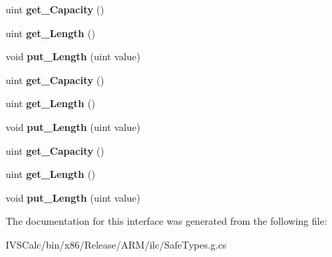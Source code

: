 \begin{DoxyCompactItemize}
uint {\bfseries get\+\_\+\+Capacity} ()
\item 
\mbox{\label{interface_windows_1_1_storage_1_1_streams_1_1_i_buffer_ab2bdd0bfe5d289ab0906235c00253ea8}} 
uint {\bfseries get\+\_\+\+Length} ()
\item 
\mbox{\label{interface_windows_1_1_storage_1_1_streams_1_1_i_buffer_af3c81c6537be15b7d1491efd58f4187f}} 
void {\bfseries put\+\_\+\+Length} (uint value)
\item 
\mbox{\label{interface_windows_1_1_storage_1_1_streams_1_1_i_buffer_a73aee2ef2c52acc14891ef47d26177d4}} 
uint {\bfseries get\+\_\+\+Capacity} ()
\item 
\mbox{\label{interface_windows_1_1_storage_1_1_streams_1_1_i_buffer_ab2bdd0bfe5d289ab0906235c00253ea8}} 
uint {\bfseries get\+\_\+\+Length} ()
\item 
\mbox{\label{interface_windows_1_1_storage_1_1_streams_1_1_i_buffer_af3c81c6537be15b7d1491efd58f4187f}} 
void {\bfseries put\+\_\+\+Length} (uint value)
\item 
\mbox{\label{interface_windows_1_1_storage_1_1_streams_1_1_i_buffer_a73aee2ef2c52acc14891ef47d26177d4}} 
uint {\bfseries get\+\_\+\+Capacity} ()
\item 
\mbox{\label{interface_windows_1_1_storage_1_1_streams_1_1_i_buffer_ab2bdd0bfe5d289ab0906235c00253ea8}} 
uint {\bfseries get\+\_\+\+Length} ()
\item 
\mbox{\label{interface_windows_1_1_storage_1_1_streams_1_1_i_buffer_af3c81c6537be15b7d1491efd58f4187f}} 
void {\bfseries put\+\_\+\+Length} (uint value)
\end{DoxyCompactItemize}


The documentation for this interface was generated from the following file\+:\begin{DoxyCompactItemize}
\item 
I\+V\+S\+Calc/bin/x86/\+Release/\+A\+R\+M/ilc/Safe\+Types.\+g.\+cs\end{DoxyCompactItemize}

